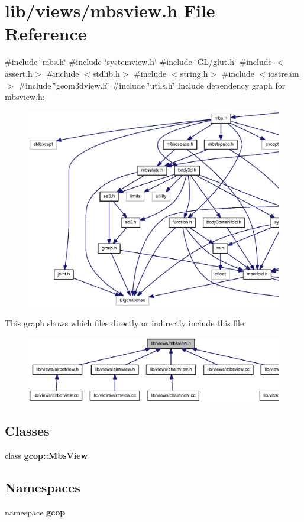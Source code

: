 \section{lib/views/mbsview.h \-File \-Reference}
\label{mbsview_8h}
{\ttfamily \#include \char`\"{}mbs.\-h\char`\"{}}\*
{\ttfamily \#include \char`\"{}systemview.\-h\char`\"{}}\*
{\ttfamily \#include \char`\"{}\-G\-L/glut.\-h\char`\"{}}\*
{\ttfamily \#include $<$assert.\-h$>$}\*
{\ttfamily \#include $<$stdlib.\-h$>$}\*
{\ttfamily \#include $<$string.\-h$>$}\*
{\ttfamily \#include $<$iostream$>$}\*
{\ttfamily \#include \char`\"{}geom3dview.\-h\char`\"{}}\*
{\ttfamily \#include \char`\"{}utils.\-h\char`\"{}}\*
\-Include dependency graph for mbsview.\-h\-:
\nopagebreak
\begin{figure}[H]
\begin{center}
\leavevmode
\includegraphics[width=350pt]{mbsview_8h__incl}
\end{center}
\end{figure}
\-This graph shows which files directly or indirectly include this file\-:
\nopagebreak
\begin{figure}[H]
\begin{center}
\leavevmode
\includegraphics[width=350pt]{mbsview_8h__dep__incl}
\end{center}
\end{figure}
\subsection*{\-Classes}
\begin{DoxyCompactItemize}
\item 
class {\bf gcop\-::\-Mbs\-View}
\end{DoxyCompactItemize}
\subsection*{\-Namespaces}
\begin{DoxyCompactItemize}
\item 
namespace {\bf gcop}
\end{DoxyCompactItemize}

